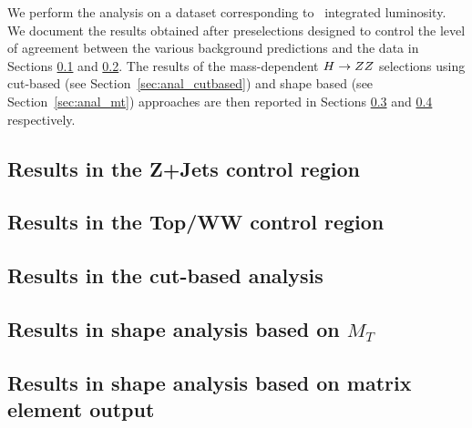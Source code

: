 We perform the analysis on a dataset corresponding to \intlumi\ integrated luminosity. 
We document the results obtained after preselections
designed to control the level of agreement between the various background predictions
and the data in Sections \ref{sec:results_zzpresel} and \ref{sec:results_topww}.
The results of the mass-dependent $H\to ZZ$ selections using cut-based 
(see Section~\ref{sec:anal_cutbased}) and shape based (see Section~\ref{sec:anal_mt}) approaches
are then reported in Sections \ref{sec:results_cut} and \ref{sec:results_mtshape} respectively.

\subsection{Results in the Z+Jets control region}
\label{sec:results_zzpresel}

\clearpage

\subsection{Results in the Top/WW control region}
\label{sec:results_topww}

\clearpage

\subsection{Results in the cut-based analysis}
\label{sec:results_cut}

\clearpage

\subsection{Results in shape analysis based on $M_T$}
\label{sec:results_mtshape}

\clearpage
 

\subsection{Results in shape analysis based on matrix element output}
\label{sec:results_meshape}

\clearpage
 